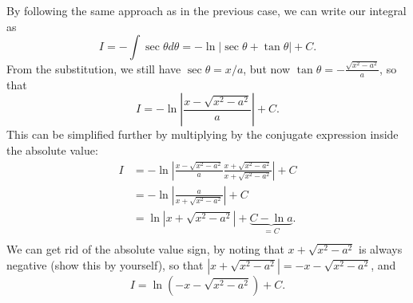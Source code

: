 \documentclass{article}
\begin{document}
By following the same approach as in the previous case, we can write our integral as
\[
  I = - \int \sec \theta d\theta = - \ln \left| \sec \theta + \tan \theta \right| + C.
\]
From the substitution, we still have $\sec \theta = x/a$, but now $\tan \theta = - \frac{\sqrt{x^2 - a^2}}{a}$, so that
\[
  I = -\ln \left| \frac{x - \sqrt{x^2 - a^2}}{a} \right| + C.
\]
This can be simplified further by multiplying by the conjugate expression inside the absolute value:
\begin{align*}
  I & = -\ln \left| \frac{x - \sqrt{x^2 - a^2}}{a} \frac{x + \sqrt{x^2 - a^2}}{x + \sqrt{x^2 - a^2}} \right| + C \\
    & = -\ln \left| \frac{a}{x + \sqrt{x^2 - a^2}} \right| + C \\
    & = \ln \left| x + \sqrt{x^2 - a^2} \right| + \underbrace{C - \ln a}_{= C}. \\
\end{align*}
We can get rid of the absolute value sign, by noting that $x + \sqrt{x^2 - a^2}$ is always negative (show this by yourself), so that $\left| x + \sqrt{x^2 - a^2} \right| = - x - \sqrt{x^2 - a^2}$, and 
\[
  I = \ln\left( - x - \sqrt{x^2 - a^2} \right) + C.
\]
\end{document}
